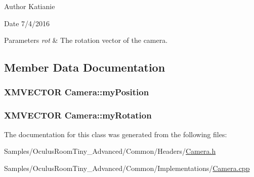 \begin{DoxyAuthor}{Author}
Katianie 
\end{DoxyAuthor}
\begin{DoxyDate}{Date}
7/4/2016
\end{DoxyDate}

\begin{DoxyParams}{Parameters}
{\em rot} & The rotation vector of the camera. \\
\hline
\end{DoxyParams}


\subsection{Member Data Documentation}
\subsubsection[{\texorpdfstring{my\+Position}{myPosition}}]{\setlength{\rightskip}{0pt plus 5cm}X\+M\+V\+E\+C\+T\+OR Camera\+::my\+Position\hspace{0.3cm}{\ttfamily [protected]}}\hypertarget{class_camera_ae90a13af9d2b2f18b19e430a3b301ae9}{}\label{class_camera_ae90a13af9d2b2f18b19e430a3b301ae9}
\subsubsection[{\texorpdfstring{my\+Rotation}{myRotation}}]{\setlength{\rightskip}{0pt plus 5cm}X\+M\+V\+E\+C\+T\+OR Camera\+::my\+Rotation\hspace{0.3cm}{\ttfamily [protected]}}\hypertarget{class_camera_a922f81f1d51693f48310a49d94c9a66e}{}\label{class_camera_a922f81f1d51693f48310a49d94c9a66e}


The documentation for this class was generated from the following files\+:\begin{DoxyCompactItemize}
\item 
Samples/\+Oculus\+Room\+Tiny\+\_\+\+Advanced/\+Common/\+Headers/\hyperlink{_camera_8h}{Camera.\+h}\item 
Samples/\+Oculus\+Room\+Tiny\+\_\+\+Advanced/\+Common/\+Implementations/\hyperlink{_camera_8cpp}{Camera.\+cpp}\end{DoxyCompactItemize}
